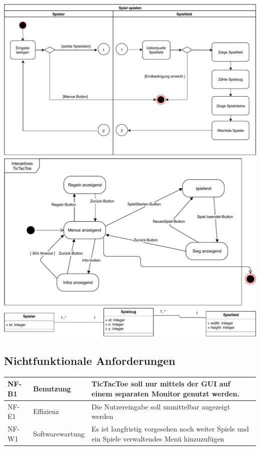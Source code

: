 \documentclass[12pt]{article}
\begin{document}
\includegraphics[scale=0.85]{Aktivitaetsdiagramm.pdf}
\vspace{5cm}
\includegraphics[scale=0.9]{Zustandsdiagramm.pdf}\\

\includegraphics[scale=0.85]{Klassendiagramm.pdf}
\subsection{Nichtfunktionale Anforderungen} 
\begin{tabularx}{\textwidth}{|X|X|X|} \hline
NF-B1&Benutzung&\Gls{TicTacToe} soll nur mittels der GUI auf einem separaten Monitor genutzt werden.\\ \hline
NF-E1&Effizienz&Die Nutzereingabe soll unmittelbar angezeigt werden\\ \hline
NF-W1&Softwarewartung&Es ist langfristig vorgesehen noch weiter Spiele und ein Spiele verwaltendes Menü hinzuzufügen \\ \hline
\end{tabularx}\\
\end{document}
